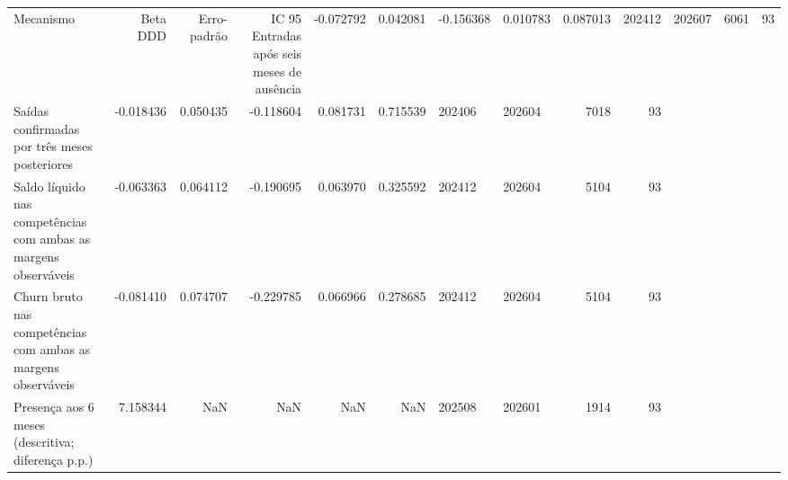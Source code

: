 \begin{tabular}{lrrrrrllrr}
\toprule
Mecanismo & Beta DDD & Erro-padrão & IC 95%
\midrule
Entradas após seis meses de ausência & -0.072792 & 0.042081 & -0.156368 & 0.010783 & 0.087013 & 202412 & 202607 & 6061 & 93 \\
Saídas confirmadas por três meses posteriores & -0.018436 & 0.050435 & -0.118604 & 0.081731 & 0.715539 & 202406 & 202604 & 7018 & 93 \\
Saldo líquido nas competências com ambas as margens observáveis & -0.063363 & 0.064112 & -0.190695 & 0.063970 & 0.325592 & 202412 & 202604 & 5104 & 93 \\
Churn bruto nas competências com ambas as margens observáveis & -0.081410 & 0.074707 & -0.229785 & 0.066966 & 0.278685 & 202412 & 202604 & 5104 & 93 \\
Presença aos 6 meses (descritiva; diferença p.p.) & 7.158344 & NaN & NaN & NaN & NaN & 202508 & 202601 & 1914 & 93 \\
\bottomrule
\end{tabular}
